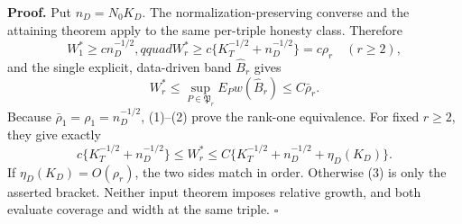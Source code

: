 \textbf{Proof.}
Put \(n_D=N_0K_D\). The normalization-preserving converse and the attaining theorem apply to the same per-triple honesty class. Therefore
\[
 W_1^*\ge cn_D^{-1/2},qquad
 W_r^*\ge c\{K_T^{-1/2}+n_D^{-1/2}\}=c\rho_r\quad(r\ge2), \tag{1}
\]
and the single explicit, data-driven band \(\widehat B_r\) gives
\[
 W_r^*\le\sup_{P\in\mathfrak P_r}E_Pw(\widehat B_r)
 \le C\bar\rho_r.                                        \tag{2}
\]
Because \(\bar\rho_1=\rho_1=n_D^{-1/2}\), (1)--(2) prove the rank-one equivalence. For fixed \(r\ge2\), they give exactly
\[
 c\{K_T^{-1/2}+n_D^{-1/2}\}
 \le W_r^*\le
 C\{K_T^{-1/2}+n_D^{-1/2}+\eta_D(K_D)\}.                 \tag{3}
\]
If \(\eta_D(K_D)=O(\rho_r)\), the two sides match in order. Otherwise (3) is only the asserted bracket. Neither input theorem imposes relative growth, and both evaluate coverage and width at the same triple. \(\square\)